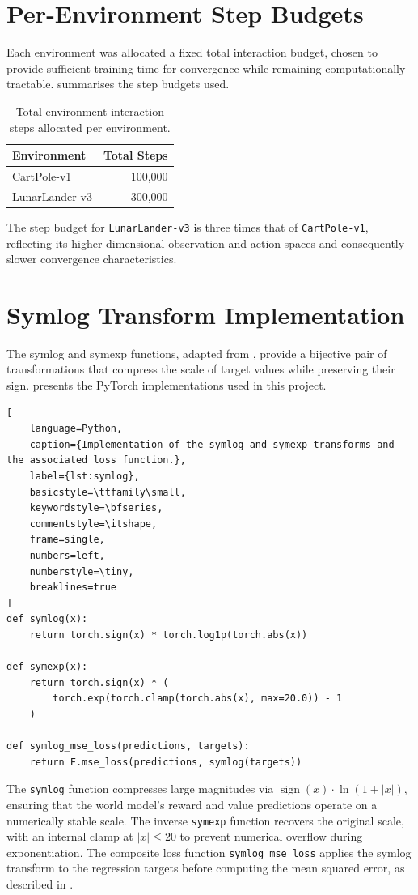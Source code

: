 \section{Per-Environment Step Budgets}

Each environment was allocated a fixed total interaction budget, chosen to provide sufficient training time for convergence while remaining computationally tractable.  summarises the step budgets used.

\begin{table}[htbp]
\centering
\caption{Total environment interaction steps allocated per environment.}
\label{tab:step_budgets}
\begin{tabular}{@{}lr@{}}
\toprule
\textbf{Environment} & \textbf{Total Steps} \\
\midrule
CartPole-v1    & 100{,}000 \\
LunarLander-v3 & 300{,}000 \\
\bottomrule
\end{tabular}
\end{table}

The step budget for \texttt{LunarLander-v3} is three times that of \texttt{CartPole-v1}, reflecting its higher-dimensional observation and action spaces and consequently slower convergence characteristics.

\section{Symlog Transform Implementation}

The symlog and symexp functions, adapted from \cite{hafner2023dreamerv3}, provide a bijective pair of transformations that compress the scale of target values while preserving their sign.  presents the PyTorch implementations used in this project.

\begin{lstlisting}[
    language=Python,
    caption={Implementation of the symlog and symexp transforms and the associated loss function.},
    label={lst:symlog},
    basicstyle=\ttfamily\small,
    keywordstyle=\bfseries,
    commentstyle=\itshape,
    frame=single,
    numbers=left,
    numberstyle=\tiny,
    breaklines=true
]
def symlog(x):
    return torch.sign(x) * torch.log1p(torch.abs(x))

def symexp(x):
    return torch.sign(x) * (
        torch.exp(torch.clamp(torch.abs(x), max=20.0)) - 1
    )

def symlog_mse_loss(predictions, targets):
    return F.mse_loss(predictions, symlog(targets))
\end{lstlisting}

The \texttt{symlog} function compresses large magnitudes via $\operatorname{sign}(x) \cdot \ln(1 + |x|)$, ensuring that the world model's reward and value predictions operate on a numerically stable scale. The inverse \texttt{symexp} function recovers the original scale, with an internal clamp at $|x| \leq 20$ to prevent numerical overflow during exponentiation. The composite loss function \texttt{symlog\_mse\_loss} applies the symlog transform to the regression targets before computing the mean squared error, as described in .
